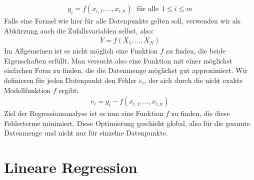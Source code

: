 \begin{align*}
    y_i = f(x_{i, 1}, \dots, x_{i, n}) ~~~\text{für alle}~~ 1 \leq i \leq m
\end{align*}
Falls eine Formel wie hier für alle Datenpunkte gelten soll, verwenden wir als Abkürzung auch die Zufallsvariablen selbst, also:
\begin{align*}
    Y = f(X_1, \dots, X_N)
\end{align*}
Im Allgemeinen ist es nicht möglich eine Funktion $f$ zu finden, die beide Eigenschaften erfüllt. Man versucht also eine Funktion mit einer möglichst einfachen Form zu finden, die die Datenmenge möglichst gut approximiert. Wir definieren für jeden Datenpunkt den Fehler $e_i$, der sich durch die nicht exakte Modellfunktion $f$ ergibt:
\begin{align*}
    e_i = y_i - f(x_{i, 1}, \dots, x_{i, n})
\end{align*}
Ziel der Regressionsanalyse ist es nun eine Funktion $f$ zu finden, die diese Fehlerterme minimiert. Diese Optimierung geschieht global, also für die gesamte Datenmenge und nicht nur für einzelne Datenpunkte.

\section{Lineare Regression}

